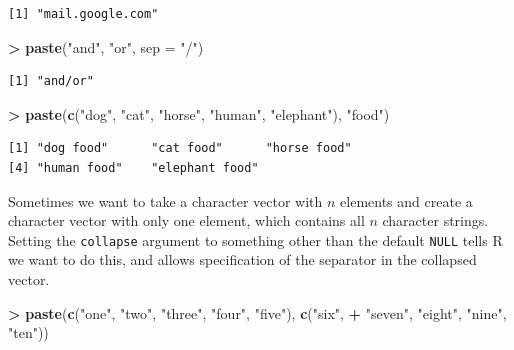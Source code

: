 \documentclass[]{krantz}
\makeatletter
\newenvironment{Shaded}{\begin{snugshade}}{\end{snugshade}}
\newcommand{\DataTypeTok}[1]{\textcolor[rgb]{0.27,0.27,0.27}{#1}}
\newcommand{\KeywordTok}[1]{\textcolor[rgb]{0.27,0.27,0.27}{\textbf{#1}}}
\newcommand{\NormalTok}[1]{#1}
\newcommand{\OperatorTok}[1]{\textcolor[rgb]{0.43,0.43,0.43}{\textbf{#1}}}
\newcommand{\StringTok}[1]{\textcolor[rgb]{0.5,0.5,0.5}{#1}}
\newenvironment{kframe}{%
\medskip{}
\setlength{\fboxsep}{.8em}
 \def\at@end@of@kframe{}%
 \ifinner\ifhmode%
  \def\at@end@of@kframe{\end{minipage}}%
  \begin{minipage}{\columnwidth}%
 \fi\fi%
 \def\FrameCommand##1{\hskip\@totalleftmargin \hskip-\fboxsep
 \colorbox{shadecolor}{##1}\hskip-\fboxsep
     \hskip-\linewidth \hskip-\@totalleftmargin \hskip\columnwidth}%
 \MakeFramed {\advance\hsize-\width
   \@totalleftmargin\z@ \linewidth\hsize
   \@setminipage}}%
 {\par\unskip\endMakeFramed%
 \at@end@of@kframe}
\renewenvironment{Shaded}{\begin{kframe}}{\end{kframe}}
\makeatother
\begin{document}
\begin{verbatim}
[1] "mail.google.com"
\end{verbatim}

\begin{Shaded}
\begin{Highlighting}[]
\OperatorTok{>}\StringTok{ }\KeywordTok{paste}\NormalTok{(}\StringTok{"and"}\NormalTok{, }\StringTok{"or"}\NormalTok{, }\DataTypeTok{sep =} \StringTok{"/"}\NormalTok{)}
\end{Highlighting}
\end{Shaded}

\begin{verbatim}
[1] "and/or"
\end{verbatim}

\begin{Shaded}
\begin{Highlighting}[]
\OperatorTok{>}\StringTok{ }\KeywordTok{paste}\NormalTok{(}\KeywordTok{c}\NormalTok{(}\StringTok{"dog"}\NormalTok{, }\StringTok{"cat"}\NormalTok{, }\StringTok{"horse"}\NormalTok{, }\StringTok{"human"}\NormalTok{, }\StringTok{"elephant"}\NormalTok{), }\StringTok{"food"}\NormalTok{)}
\end{Highlighting}
\end{Shaded}

\begin{verbatim}
[1] "dog food"      "cat food"      "horse food"   
[4] "human food"    "elephant food"
\end{verbatim}

Sometimes we want to take a character vector with \(n\) elements and create a character vector with only one element, which contains all \(n\) character strings. Setting the \texttt{collapse} argument to something other than the default \texttt{NULL} tells R we want to do this, and allows specification of the separator in the collapsed vector.

\begin{Shaded}
\begin{Highlighting}[]
\OperatorTok{>}\StringTok{ }\KeywordTok{paste}\NormalTok{(}\KeywordTok{c}\NormalTok{(}\StringTok{"one"}\NormalTok{, }\StringTok{"two"}\NormalTok{, }\StringTok{"three"}\NormalTok{, }\StringTok{"four"}\NormalTok{, }\StringTok{"five"}\NormalTok{), }\KeywordTok{c}\NormalTok{(}\StringTok{"six"}\NormalTok{, }
\OperatorTok{+}\StringTok{   "seven"}\NormalTok{, }\StringTok{"eight"}\NormalTok{, }\StringTok{"nine"}\NormalTok{, }\StringTok{"ten"}\NormalTok{))}
\end{Highlighting}
\end{Shaded}
\end{document}

